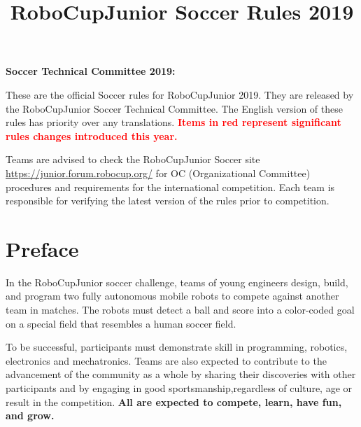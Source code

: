 \documentclass{article}
\title{\vspace{-5ex}RoboCupJunior Soccer Rules 2019\vspace{-5ex}}
\date{\vspace{-2ex}}
\begin{document}
\maketitle
\thispagestyle{firststyle}

\textbf{Soccer Technical Committee 2019:}


These are the official Soccer rules for RoboCupJunior 2019. They are released
by the RoboCupJunior Soccer Technical Committee. The English version of these
rules has priority over any translations. \textcolor{red}{\textbf{Items in red
represent significant rules changes introduced this year.}}

Teams are advised to check the RoboCupJunior Soccer site
\href{https://junior.forum.robocup.org/}{https://junior.forum.robocup.org/}
for OC (Organizational Committee) procedures and requirements for the
international competition. Each team is responsible for verifying the latest version of the
rules prior to competition.

\section*{Preface}

In the RoboCupJunior soccer challenge, teams of young engineers design, build,
and program two fully autonomous mobile robots to compete against another team
in matches. The robots must detect a ball and score into a color-coded goal on
a special field that resembles a human soccer field.

To be successful, participants must demonstrate skill in programming, robotics,
electronics and mechatronics.  Teams are also expected to contribute to the
advancement of the community as a whole by sharing their discoveries with other
participants and by engaging in good sportsmanship,regardless of culture, age or
result in the competition. \textbf{All are expected to compete,
learn, have fun, and grow.}
\end{document}
